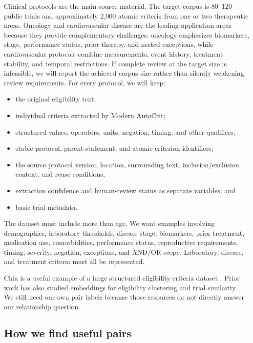 \documentclass[11pt]{article}
\begin{document}
Clinical protocols are the main source material. The target corpus is 80--120 public trials and approximately 2,000 atomic criteria from one or two therapeutic areas. Oncology and cardiovascular disease are the leading application areas because they provide complementary challenges: oncology emphasizes biomarkers, stage, performance status, prior therapy, and nested exceptions, while cardiovascular protocols combine measurements, event history, treatment stability, and temporal restrictions. If complete review at the target size is infeasible, we will report the achieved corpus size rather than silently weakening review requirements. For every protocol, we will keep:

\begin{itemize}
    \item the original eligibility text;
    \item individual criteria extracted by Modern AutoCrit;
    \item structured values, operators, units, negation, timing, and other qualifiers;
    \item stable protocol, parent-statement, and atomic-criterion identifiers;
    \item the source protocol version, location, surrounding text, inclusion/exclusion context, and reuse conditions;
    \item extraction confidence and human-review status as separate variables; and
    \item basic trial metadata.
\end{itemize}

The dataset must include more than age. We want examples involving demographics, laboratory thresholds, disease stage, biomarkers, prior treatment, medication use, comorbidities, performance status, reproductive requirements, timing, severity, negation, exceptions, and AND/OR scope. Laboratory, disease, and treatment criteria must all be represented.

Chia is a useful example of a large structured eligibility-criteria dataset \cite{chia}. Prior work has also studied embeddings for eligibility clustering and trial similarity \cite{clusters,trial2vec}. We still need our own pair labels because those resources do not directly answer our relationship question.

\subsection{How we find useful pairs}
\end{document}
